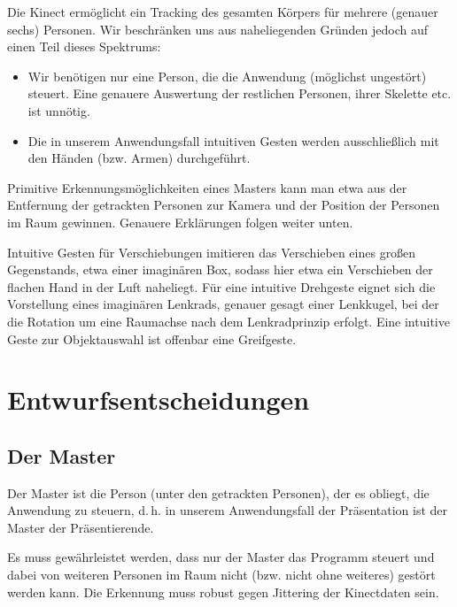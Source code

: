\documentclass[12pt,a4paper]{article}
\begin{document}
	Die Kinect ermöglicht ein Tracking des gesamten Körpers für mehrere (genauer sechs) Personen. Wir beschränken uns aus naheliegenden Gründen jedoch auf einen Teil dieses Spektrums:
	\begin{itemize}
		\item Wir benötigen nur eine Person, die die Anwendung (möglichst ungestört) steuert. Eine genauere Auswertung der restlichen Personen, ihrer Skelette etc. ist unnötig.
		\item Die in unserem Anwendungsfall intuitiven Gesten werden ausschließlich mit den Händen (bzw. Armen) durchgeführt.
	\end{itemize}
	Primitive Erkennungsmöglichkeiten eines Masters kann man etwa aus der Entfernung der getrackten Personen zur Kamera und der Position der Personen im Raum gewinnen. Genauere Erklärungen folgen weiter unten.\par 
	Intuitive Gesten für Verschiebungen imitieren das Verschieben eines großen Gegenstands, etwa einer imaginären Box, sodass hier etwa ein Verschieben der flachen Hand in der Luft naheliegt. Für eine intuitive Drehgeste eignet sich die Vorstellung eines imaginären Lenkrads, genauer gesagt einer Lenkkugel, bei der die Rotation um eine Raumachse nach dem Lenkradprinzip erfolgt. Eine intuitive Geste zur Objektauswahl ist offenbar eine Greifgeste.
	\section{Entwurfsentscheidungen}
	\subsection{Der Master}
	Der Master ist die Person (unter den getrackten Personen), der es obliegt, die Anwendung zu steuern, d.\,h. in unserem Anwendungsfall der Präsentation ist der Master der Präsentierende.\par
	Es muss gewährleistet werden, dass nur der Master das Programm steuert und dabei von weiteren Personen im Raum nicht (bzw. nicht ohne weiteres) gestört werden kann. Die Erkennung muss robust gegen Jittering der Kinectdaten sein.
\end{document}

